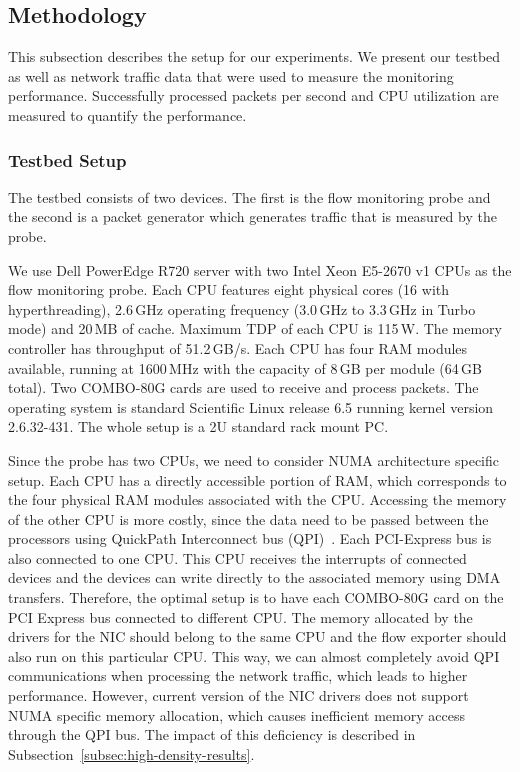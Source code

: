 \subsection{Methodology} \label{subsec:high-density-methodology}

This subsection describes the setup for our experiments. We present our testbed as well as network traffic data that were used to measure the monitoring performance. Successfully processed packets per second and CPU utilization are measured to quantify the performance.

\subsubsection{Testbed Setup}

The testbed consists of two devices. The first is the flow monitoring probe and the second is a packet generator which generates traffic that is measured by the probe.

We use Dell PowerEdge R720 server with two Intel Xeon E5-2670 v1 CPUs as the flow monitoring probe. Each CPU features eight physical cores (16 with hyperthreading), 2.6\,GHz operating frequency (3.0\,GHz to 3.3\,GHz in Turbo mode) and 20\,MB of cache. Maximum TDP of each CPU is 115\,W. The memory controller has throughput of 51.2\,GB/s. Each CPU has four RAM modules available, running at 1600\,MHz with the capacity of 8\,GB per module (64\,GB total). Two COMBO-80G cards are used to receive and process packets. The operating system is standard Scientific Linux release 6.5 running kernel version 2.6.32-431. The whole setup is a 2U standard rack mount PC.

Since the probe has two CPUs, we need to consider NUMA architecture specific setup. Each CPU has a directly accessible portion of RAM, which corresponds to the four physical RAM modules associated with the CPU. Accessing the memory of the other CPU is more costly, since the data need to be passed between the processors using QuickPath Interconnect bus (QPI)~\cite{IntelCorporation-2009-Introduction}. Each PCI-Express bus is also connected to one CPU. This CPU receives the interrupts of connected devices and the devices can write directly to the associated memory using DMA transfers. Therefore, the optimal setup is to have each COMBO-80G card on the PCI Express bus connected to different CPU. The memory allocated by the drivers for the NIC should belong to the same CPU and the flow exporter should also run on this particular CPU. This way, we can almost completely avoid QPI communications when processing the network traffic, which leads to higher performance. However, current version of the NIC drivers does not support NUMA specific memory allocation, which causes inefficient memory access through the QPI bus. The impact of this deficiency is described in Subsection~\ref{subsec:high-density-results}.

